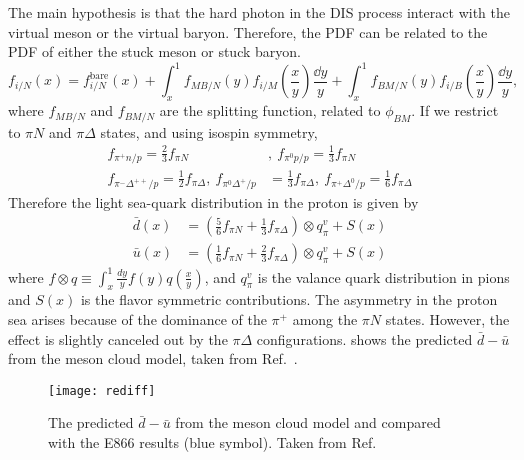 \documentclass[../main.tex]{subfiles}
\begin{document}
The main hypothesis is that the hard photon in the DIS process interact with the virtual meson or the virtual
baryon. Therefore, the PDF can be related to the PDF of either the stuck meson or stuck baryon.
\begin{equation}
	f_{i/N}\left(x\right) = f_{i/N}^{\mathrm{bare}}\left(x\right) +  \int^1_x f_{MB/N}\left(y\right) f_{i/M}\left(\frac{x}{y}\right) \frac{\dd{y}}{y} + \int^1_x f_{BM/N}\left(y\right) f_{i/B}\left(\frac{x}{y}\right) \frac{\dd{y}}{y},
\end{equation}
where $f_{MB/N}$ and $f_{BM/N}$ are the splitting function, related to $\phi_{BM}$.
If we restrict to $\pi N$ and $\pi\Delta$ states, and using isospin symmetry,
\begin{align}
	f_{\pi^+n/p}=\frac{2}{3} f_{\pi N}                                       & , ~f_{\pi^0 p/p}=\frac{1}{3} f_{\pi N}                                           \\
	f_{\pi^-\Delta^{++}/p}=\frac{1}{2} f_{\pi \Delta}, ~f_{\pi^0 \Delta^+/p} & =\frac{1}{3} f_{\pi \Delta},  ~f_{\pi^+ \Delta^0/p}=\frac{1}{6} f_{\pi \Delta}
\end{align}
Therefore the light sea-quark distribution in the proton is given by
\begin{align}
	\bar{d}(x) &= \left(\frac{5}{6}f_{\pi N} + \frac{1}{3}f_{\pi \Delta}\right)\otimes q^v_\pi + S(x)\\
	\bar{u}(x) &= \left(\frac{1}{6}f_{\pi N} + \frac{2}{3}f_{\pi \Delta}\right)\otimes q^v_\pi + S(x)
\end{align}
where $f\otimes q\equiv \int^1_x \frac{dy}{y}f(y)q\left(\frac{x}{y}\right)$, and $q^v_\pi$ is the valance
quark distribution in pions and $S(x)$ is the flavor symmetric contributions. 
The asymmetry in the proton sea arises because of the dominance of the $\pi^+$ among the $\pi N$ states.
However, the effect is slightly canceled out by the $\pi\Delta$ configurations. 
shows the predicted $\bar{d}-\bar{u}$ from the meson cloud model, taken from Ref.~\cite{alberg2022}. 
\begin{figure}
	\centering
	\texttt{[image: rediff]}
	\caption{The predicted $\bar{d}-\bar{u}$ from the meson cloud model and compared with the E866 results (blue symbol). Taken from Ref.~\cite{alberg2022}}
	\label{fig:pion_cloud}
\end{figure}
\end{document}
